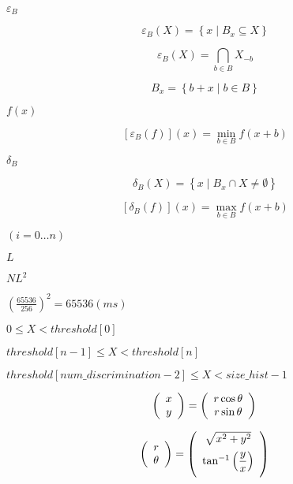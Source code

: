 \documentclass{article}
\begin{document}
{$\varepsilon _{B}$
\pagebreak

\[ \varepsilon _{B}\left(X\right)=\left\{ x\mid B_{x}\subseteq X\right\} \]
\pagebreak

\[ \varepsilon _{B}\left(X\right)= \bigcap \limits _{b\in B} X_{-b} \]
\pagebreak

\[ B_{x}=\left\{ b+x \mid b\in B\right\} \]
\pagebreak

$f\left(x\right)$
\pagebreak

\[ \left[\varepsilon _{B}\left(f\right)\right]\left(x\right)=\min \limits _{b\in B}f\left(x+b\right) \]
\pagebreak

$\delta _{B}$
\pagebreak

\[ \delta _{B}\left(X\right)=\left\{ x\mid B_{x}\cap X\ne \emptyset \right\} \]
\pagebreak

\[ \left[\delta _{B}\left(f\right)\right]\left(x\right)=\max \limits _{b\in B}f\left(x+b\right) \]
\pagebreak

$(i=0 \ldots n)$
\pagebreak

$L$
\pagebreak

$ NL^{2} $
\pagebreak

$(\frac{65536}{256})^{2} = 65536(ms) $
\pagebreak

$ 0 \le X < threshold[0] $
\pagebreak

$ threshold[n-1] \le X < threshold[n] $
\pagebreak

$ threshold[num\_discrimination-2] \le X < size\_hist-1 $
\pagebreak

\[ \left( \begin{array}{c} x \\ y \\ \end{array} \right) = \left( \begin{array}{c} r\cos \theta \\ r\sin \theta \\ \end{array} \right) \\ \]
\pagebreak

\[ \left( \begin{array}{c} r \\ \theta \\ \end{array} \right) = \left( \begin{array}{c} \sqrt{x^2+y^2} \vspace{.5em} \\ \tan^{-1}\left(\dfrac{y}{x}\right) \vspace{.5em} \\ \end{array} \right) \\ \]
\pagebreak

}
\end{document}
